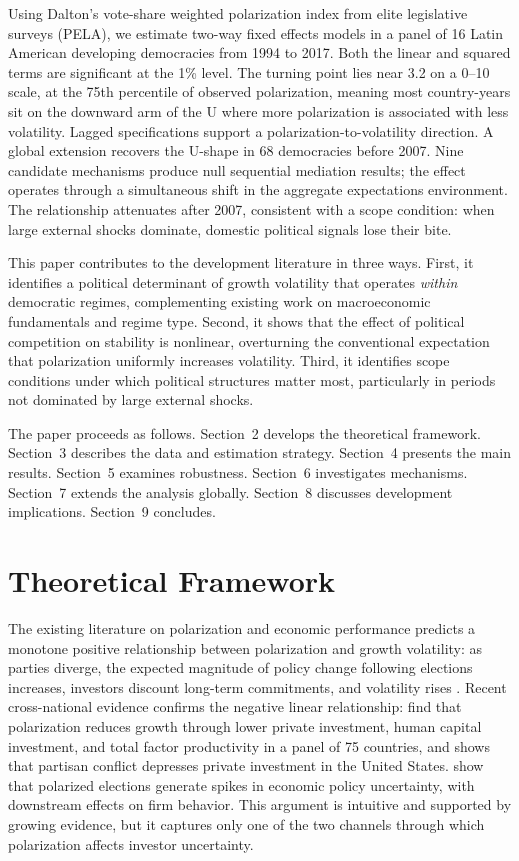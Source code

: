 \documentclass[12pt]{article}
\begin{document}
Using Dalton's \citeyearpar{Dalton2008} vote-share weighted polarization
index from elite legislative surveys (PELA), we estimate two-way fixed
effects models in a panel of 16 Latin American developing democracies from
1994 to 2017. Both the linear and squared terms are significant at the 1\%
level. The turning point lies near 3.2 on a 0--10 scale, at the 75th
percentile of observed polarization, meaning most country-years sit on the
downward arm of the U where more polarization is associated with less
volatility. Lagged specifications support a polarization-to-volatility
direction. A global extension recovers the U-shape in 68 democracies before
2007. Nine candidate mechanisms produce null sequential mediation results;
the effect operates through a simultaneous shift in the aggregate
expectations environment. The relationship attenuates after 2007, consistent
with a scope condition: when large external shocks dominate, domestic
political signals lose their bite.

This paper contributes to the development literature in three ways. First,
it identifies a political determinant of growth volatility that operates
\textit{within} democratic regimes, complementing existing work on
macroeconomic fundamentals and regime type. Second, it shows that the effect
of political competition on stability is nonlinear, overturning the
conventional expectation that polarization uniformly increases volatility.
Third, it identifies scope conditions under which political structures
matter most, particularly in periods not dominated by large external shocks.

The paper proceeds as follows. Section~2 develops the theoretical framework.
Section~3 describes the data and estimation strategy. Section~4 presents the
main results. Section~5 examines robustness. Section~6 investigates
mechanisms. Section~7 extends the analysis globally. Section~8 discusses
development implications. Section~9 concludes.


\section{Theoretical Framework}

The existing literature on polarization and economic performance predicts a
monotone positive relationship between polarization and growth volatility:
as parties diverge, the expected magnitude of policy change following
elections increases, investors discount long-term commitments, and volatility
rises \citep{Frye2002, AzzimontTalbert2014, Scartascini2013}. Recent
cross-national evidence confirms the negative linear relationship:
\citet{DornFuestImmelNeumeier2025} find that polarization reduces growth
through lower private investment, human capital investment, and total factor
productivity in a panel of 75 countries, and \citet{Azzimonti2018} shows
that partisan conflict depresses private investment in the United States.
\citet{BakerBloomDavisRodden2020} show that polarized elections generate
spikes in economic policy uncertainty, with downstream effects on firm
behavior. This argument is intuitive and supported by growing evidence, but
it captures only one of the two channels through which polarization affects
investor uncertainty.
\end{document}
